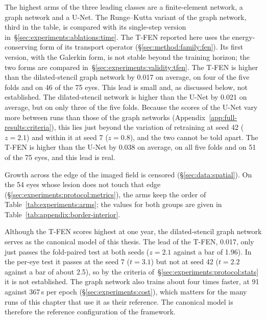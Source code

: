 The highest arms of the three leading classes are a finite-element network,
a graph network and a U-Net. The Runge--Kutta variant of the graph network,
third in the table, is compared with its single-step version
in~\S\ref{sec:experiments:ablations:time}. The T-FEN reported here uses the energy-conserving form of its
transport operator (\S\ref{sec:method:family:fen}). Its first version, with
the Galerkin form, is not stable beyond the training horizon; the two forms
are compared in~\S\ref{sec:experiments:validity:tfen}. The T-FEN is higher
than the dilated-stencil graph network by 0.017 on average, on four of the
five folds and on 46 of the 75 eyes. This lead is small and, as discussed
below, not established. The
dilated-stencil network is higher than the U-Net by 0.021 on average, but
on only three of the five folds. Because the scores of the U-Net vary more
between runs than those of the graph networks
(Appendix~\ref{app:full-results:criteria}), this lies just beyond the
variation of retraining at seed 42 ($z = 2.1$) and within it at
seed 7 ($z = 0.8$), and the two cannot be told apart. The T-FEN is higher than
the U-Net by 0.038 on average, on all five folds and on 51 of the 75 eyes,
and this lead is real.

Growth across the edge of the imaged field is censored
(\S\ref{sec:data:spatial}). On the 54 eyes whose lesion does not touch that
edge (\S\ref{sec:experiments:protocol:metrics}), the arms keep the order of
Table~\ref{tab:experiments:arms}; the values for both groups are given in
Table~\ref{tab:appendix:border-interior}.

Although the T-FEN scores highest at one year, the dilated-stencil graph
network serves as the canonical model of this thesis. The lead of the
T-FEN, 0.017, only just passes the fold-paired test at both seeds
($z = 2.1$ against a bar of 1.96). In the per-eye test it passes at the
seed 7 ($t = 3.1$) but not at seed 42 ($t = 2.2$ against a bar of
about 2.5), so by the criteria of~\S\ref{sec:experiments:protocol:stats}
it is not established. The graph network also trains about four times
faster, at 91 against 367\,s per epoch (\S\ref{sec:experiments:cost}),
which matters for the many runs of this chapter that use it as their
reference. The canonical model is therefore the reference configuration of
the framework.

